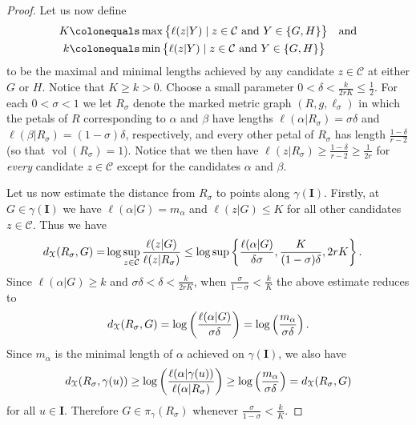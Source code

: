 \documentclass[letterpaper,fleqn]{article}
\theoremstyle{plain}
\theoremstyle{definition}
\newcommand{\os}{{\EuScript X}} %
\newcommand{\len}{\ell}  %
\newcommand{\cp}{\pi} %
\newcommand{\minlen}{m}  %
\DeclareMathOperator{\vol}{vol} %
\newcommand{\I}{\mathbf{I}}
\begin{document}
\begin{proof}
Let us now define 
\begin{align*}
K \colonequals& \max \big\{ \ell(z\vert Y) \mid z\in \mathcal{C}\text{ and }Y\in \{G,H\}\big\} \quad\text{and}\\
k \colonequals& \min \big\{ \ell(z\vert Y) \mid z\in \mathcal{C}\text{ and }Y\in \{G,H\}\big\}
\end{align*}
to be the maximal and minimal lengths achieved by any candidate $z\in \mathcal{C}$ at either $G$ or $H$. Notice that $K\ge k > 0$. Choose a small parameter  $0 <  \delta < \frac{k}{2rK} \le \frac{1}{2}$.
For each $0 < \sigma < 1$ we let $R_\sigma$ denote the marked metric graph $(R,g,\ell_\sigma)$ in which the petals of $R$ corresponding to $\alpha$ and $\beta$ have lengths $\ell(\alpha\vert R_\sigma) = \sigma\delta$ and $\ell(\beta \vert R_\sigma) = (1-\sigma)\delta$, respectively, and every other petal of $R_\sigma$ has length $\frac{1-\delta}{r-2}$ (so that $\vol(R_\sigma) = 1$). Notice that we then have $\ell(z\vert  R_\sigma) \ge \frac{1-\delta}{r-2} \ge \frac{1}{2r}$ for \emph{every} candidate $z\in \mathcal C$ except for the candidates $\alpha$ and $\beta$. 

Let us now estimate the distance from $R_\sigma$ to points along $\gamma(\I)$. 
Firstly, at $G\in \gamma(\I)$ we have $\len(\alpha\vert G) = \minlen_\alpha$ and $\len(z\vert G) \le K$ for all other candidates $z\in \mathcal{C}$. Thus we have 
\begin{align*}
d_\os(R_\sigma, G) =& \log\sup_{z\in \mathcal C} \frac{\ell(z \vert G)}{\ell(z\vert R_\sigma)}
\le \log\sup\left\{ \frac{\len(\alpha\vert G)}{\delta \sigma}, \frac{K}{(1-\sigma)\delta}, 2rK\right\}.
\end{align*}
Since $\len(\alpha\vert G) \ge k$ and $\sigma\delta < \delta < \frac{k}{2rK}$, when $\frac{\sigma}{1-\sigma} < \frac{k}{K}$ the above estimate reduces to
\[d_\os(R_\sigma,G) = \log\left(\frac{\len(\alpha\vert G)}{\sigma\delta}\right) = \log\left(\frac{\minlen_\alpha}{\sigma\delta}\right).\]
Since $\minlen_\alpha$ is the minimal length of $\alpha$ achieved on $\gamma(\I)$, we also have
\begin{equation}\label{eqn:alpha_dist}
d_\os(R_\sigma,\gamma(u)) \ge \log\left(\frac{\len(\alpha\vert \gamma(u))}{\len(\alpha\vert R_\sigma)}\right) \ge \log\left(\frac{\minlen_\alpha}{\sigma\delta}\right) = d_\os(R_\sigma,G)
\end{equation}
for all $u\in \I$. Therefore $G\in \cp_\gamma(R_\sigma)$ whenever $\frac{\sigma}{1-\sigma} < \frac{k}{K}$.  


\end{proof}
\end{document}
